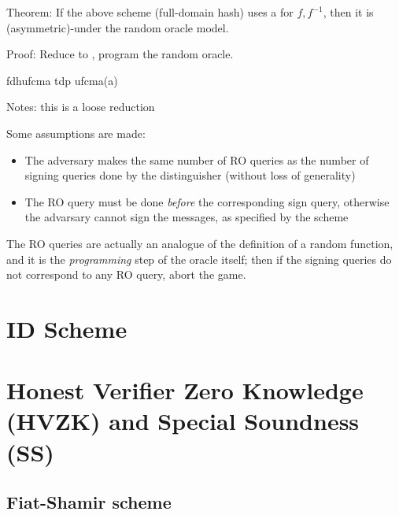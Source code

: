 Theorem: If the above scheme (full-domain hash) uses a \tdp{} for $f, f^{-1}$, then it is (asymmetric)-\ufcma under the random oracle model.

Proof: Reduce to \tdp, program the random oracle.

\begin{cryptoredux}
    {fdhufcma}
    {}
    {tdp}
    {ufcma(a)}



    \cseqdelay
    \cseqbeginloop
    \invoke{}{$\sigma$}{}
    \cseqendloop
    \cseqdelay


    \send{}{$\sigma^*$}{}
\end{cryptoredux}

Notes: this is a loose reduction

Some assumptions are made:

\begin{itemize}
    \item The adversary makes the same number of RO queries as the number of signing queries done by the distinguisher (without loss of generality)
    \item The RO query must be done \emph{before} the corresponding sign query, otherwise the advarsary cannot sign the messages, as specified by the scheme
\end{itemize}

The RO queries are actually an analogue of the definition of a random function, and it is the \emph{programming} step of the oracle itself; then if the signing queries do not correspond to any RO query, abort the game.

\section{ID Scheme}

\section{Honest Verifier Zero Knowledge (HVZK) and Special Soundness (SS)}

\subsection{Fiat-Shamir scheme}